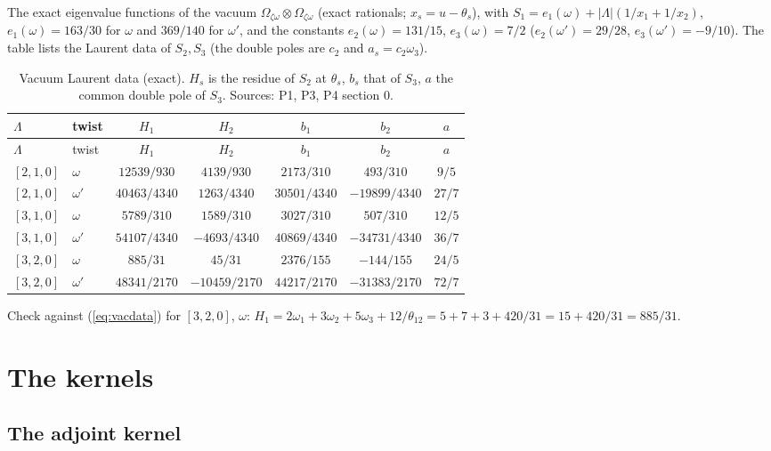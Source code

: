 \documentclass[11pt]{article}
\begin{document}
The exact eigenvalue functions of the vacuum $\Omega_{\zeta\omega}\otimes\Omega_{\zeta\omega}$ (exact rationals; $x_s=u-\theta_s$), with $S_1=e_1(\omega)+|\Lambda|(1/x_1+1/x_2)$, $e_1(\omega)=163/30$ for $\omega$ and $369/140$ for $\omega'$, and the constants $e_2(\omega)=131/15$, $e_3(\omega)=7/2$ ($e_2(\omega')=29/28$, $e_3(\omega')=-9/10$).
The table lists the Laurent data of $S_2,S_3$ (the double poles are $c_2$ and $a_s=c_2\omega_3$).

{\small
\begin{longtable}{llccccc}
\caption{Vacuum Laurent data (exact). $H_s$ is the residue of $S_2$ at $\theta_s$, $b_s$ that of $S_3$, $a$ the common double pole of $S_3$. Sources: P1, P3, P4 section 0.}\label{tab:vac}\\
\toprule
$\Lambda$ & twist & $H_1$ & $H_2$ & $b_1$ & $b_2$ & $a$ \\
\midrule
\endfirsthead
\toprule
$\Lambda$ & twist & $H_1$ & $H_2$ & $b_1$ & $b_2$ & $a$ \\
\midrule
\endhead
\bottomrule
\endlastfoot
$[2,1,0]$ & $\omega$ & $12539/930$ & $4139/930$ & $2173/310$ & $493/310$ & $9/5$ \\
$[2,1,0]$ & $\omega'$ & $40463/4340$ & $1263/4340$ & $30501/4340$ & $-19899/4340$ & $27/7$ \\
$[3,1,0]$ & $\omega$ & $5789/310$ & $1589/310$ & $3027/310$ & $507/310$ & $12/5$ \\
$[3,1,0]$ & $\omega'$ & $54107/4340$ & $-4693/4340$ & $40869/4340$ & $-34731/4340$ & $36/7$ \\
$[3,2,0]$ & $\omega$ & $885/31$ & $45/31$ & $2376/155$ & $-144/155$ & $24/5$ \\
$[3,2,0]$ & $\omega'$ & $48341/2170$ & $-10459/2170$ & $44217/2170$ & $-31383/2170$ & $72/7$ \\
\end{longtable}}


Check against (\ref{eq:vacdata}) for $[3,2,0]$, $\omega$: $H_1=2\omega_1+3\omega_2+5\omega_3+12/\theta_{12}=5+7+3+420/31=15+420/31=885/31$.

\section{The kernels}\label{app:K}

\subsection{The adjoint kernel}\label{app:Kadj}
\end{document}
